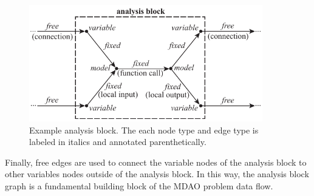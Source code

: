 \begin{figure}[htb!]
    \begin{center}
    \includegraphics[width=4in]{images/analysis_block}
    \end{center}
    \vspace{-10pt}
\caption{Example analysis block. The each node type and edge type is labeled in italics and annotated parenthetically.}
\label{f:analysis block}
\end{figure}

Finally, free edges are used to connect the variable nodes of the analysis block 
to other variables nodes outside of the analysis block. In this way, the 
analysis block graph is a fundamental building block of the MDAO problem data flow.


